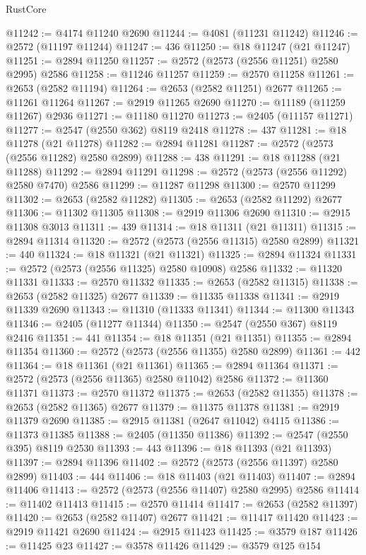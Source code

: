 \begin{lexlean}{RustCore}
\begin{coremodule}
@11242 := @4174 @11240 @2690
@11244 := @4081 (@11231 @11242)
@11246 := @2572 (@11197 @11244)
@11247 := 436
@11250 := @18 @11247 (@21 @11247)
@11251 := @2894 @11250
@11257 := @2572 (@2573 (@2556 @11251) @2580 @2995) @2586
@11258 := @11246 @11257
@11259 := @2570 @11258
@11261 := @2653 (@2582 @11194)
@11264 := @2653 (@2582 @11251) @2677
@11265 := @11261 @11264
@11267 := @2919 @11265 @2690
@11270 := @11189 (@11259 @11267) @2936
@11271 := @11180 @11270
@11273 := @2405 (@11157 @11271)
@11277 := @2547 (@2550 @362) @8119 @2418
@11278 := 437
@11281 := @18 @11278 (@21 @11278)
@11282 := @2894 @11281
@11287 := @2572 (@2573 (@2556 @11282) @2580 @2899)
@11288 := 438
@11291 := @18 @11288 (@21 @11288)
@11292 := @2894 @11291
@11298 := @2572 (@2573 (@2556 @11292) @2580 @7470) @2586
@11299 := @11287 @11298
@11300 := @2570 @11299
@11302 := @2653 (@2582 @11282)
@11305 := @2653 (@2582 @11292) @2677
@11306 := @11302 @11305
@11308 := @2919 @11306 @2690
@11310 := @2915 @11308 @3013
@11311 := 439
@11314 := @18 @11311 (@21 @11311)
@11315 := @2894 @11314
@11320 := @2572 (@2573 (@2556 @11315) @2580 @2899)
@11321 := 440
@11324 := @18 @11321 (@21 @11321)
@11325 := @2894 @11324
@11331 := @2572 (@2573 (@2556 @11325) @2580 @10908) @2586
@11332 := @11320 @11331
@11333 := @2570 @11332
@11335 := @2653 (@2582 @11315)
@11338 := @2653 (@2582 @11325) @2677
@11339 := @11335 @11338
@11341 := @2919 @11339 @2690
@11343 := @11310 (@11333 @11341)
@11344 := @11300 @11343
@11346 := @2405 (@11277 @11344)
@11350 := @2547 (@2550 @367) @8119 @2416
@11351 := 441
@11354 := @18 @11351 (@21 @11351)
@11355 := @2894 @11354
@11360 := @2572 (@2573 (@2556 @11355) @2580 @2899)
@11361 := 442
@11364 := @18 @11361 (@21 @11361)
@11365 := @2894 @11364
@11371 := @2572 (@2573 (@2556 @11365) @2580 @11042) @2586
@11372 := @11360 @11371
@11373 := @2570 @11372
@11375 := @2653 (@2582 @11355)
@11378 := @2653 (@2582 @11365) @2677
@11379 := @11375 @11378
@11381 := @2919 @11379 @2690
@11385 := @2915 @11381 (@2647 @11042) @4115
@11386 := @11373 @11385
@11388 := @2405 (@11350 @11386)
@11392 := @2547 (@2550 @395) @8119 @2530
@11393 := 443
@11396 := @18 @11393 (@21 @11393)
@11397 := @2894 @11396
@11402 := @2572 (@2573 (@2556 @11397) @2580 @2899)
@11403 := 444
@11406 := @18 @11403 (@21 @11403)
@11407 := @2894 @11406
@11413 := @2572 (@2573 (@2556 @11407) @2580 @2995) @2586
@11414 := @11402 @11413
@11415 := @2570 @11414
@11417 := @2653 (@2582 @11397)
@11420 := @2653 (@2582 @11407) @2677
@11421 := @11417 @11420
@11423 := @2919 @11421 @2690
@11424 := @2915 @11423
@11425 := @3579 @187
@11426 := @11425 @23
@11427 := @3578 @11426
@11429 := @3579 @125 @154

\end{coremodule}
\end{lexlean}
